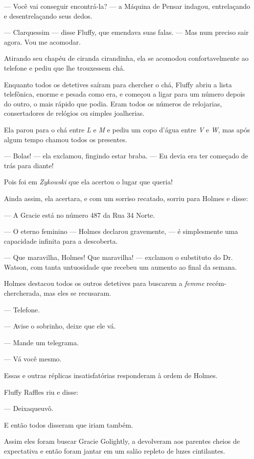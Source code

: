 --- Você vai conseguir encontrá-la? --- a Máquina de Pensar indagou,
entrelaçando e desentrelaçando seus dedos.

--- Clarquessim --- disse Fluffy, que emendava suas falas. --- Mas num
preciso sair agora. Vou me acomodar.

Atirando seu chapéu de ciranda cirandinha, ela se acomodou
confortavelmente ao telefone e pediu que lhe trouxessem chá.

Enquanto todos os detetives saíram para chercher o chá, Fluffy abriu a
lista telefônica, enorme e pesada como era, e começou a ligar para um
número depois do outro, o mais rápido que podia. Eram todos os números
de relojarias, consertadores de relógios ou simples joalherias.

Ela parou para o chá entre \emph{L} e \emph{M} e pediu um copo d'água
entre \emph{V} e \emph{W}, mas após algum tempo chamou todos os
presentes.

--- Bolas! --- ela exclamou, fingindo estar braba. --- Eu devia era ter
começado de trás para diante!

Pois foi em \emph{Zykowski} que ela acertou o lugar que queria!

Ainda assim, ela acertara, e com um sorriso recatado, sorriu para Holmes
e disse:

--- A Gracie está no número 487 da Rua 34 Norte.

--- O eterno feminino --- Holmes declarou gravemente, --- é simplesmente
uma capacidade infinita para a descoberta.

--- Que maravilha, Holmes! Que maravilha! --- exclamou o substituto do
Dr. Watson, com tanta untuosidade que recebeu um aumento ao final da
semana.

Holmes destacou todos os outros detetives para buscarem a \emph{femme}
recém-chercherada, mas eles se recusaram.

--- Telefone.

--- Avise o sobrinho, deixe que ele vá.

--- Mande um telegrama.

--- Vá você mesmo.

Essas e outras réplicas insatisfatórias responderam à ordem de Holmes.

Fluffy Raffles riu e disse:

--- Deixaqueuvô.

E então todos disseram que iriam também.

Assim eles foram buscar Gracie Golightly, a devolveram aos parentes
cheios de expectativa e então foram jantar em um salão repleto de luzes
cintilantes.

